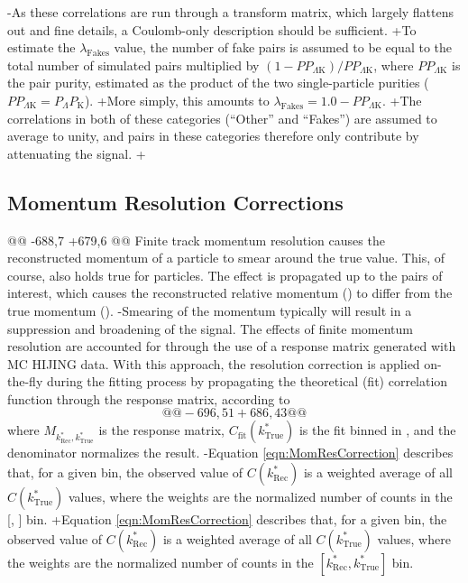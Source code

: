 \begin{table}[htbp]
\begin{table}[htbp]
-As these correlations are run through a transform matrix, which largely flattens out and fine details, a Coulomb-only description should be sufficient.   
+To estimate the $\lambda_{\mathrm{Fakes}}$ value, the number of fake pairs is assumed to be equal to the total number of simulated pairs multiplied by $(1-PP_{\Lambda\mathrm{K}})/PP_{\Lambda\mathrm{K}}$, where $PP_{\Lambda\mathrm{K}}$ is the \LamK pair purity, estimated as the product of the two single-particle purities ($PP_{\Lambda\mathrm{K}} = P_{\Lambda}P_{\mathrm{K}}$).
+More simply, this amounts to $\lambda_{\mathrm{Fakes}} = 1.0-PP_{\Lambda\mathrm{K}}$.
+The correlations in both of these categories (``Other'' and ``Fakes'') are assumed to average to unity, and pairs in these categories therefore only contribute by attenuating the signal. 
+
 
 
 \subsection{Momentum Resolution Corrections}
@@ -688,7 +679,6 @@
 Finite track momentum resolution causes the reconstructed momentum of a particle to smear around the true value.
 This, of course, also holds true for \Vz particles.
 The effect is propagated up to the pairs of interest, which causes the reconstructed relative momentum (\krec) to differ from the true momentum (\ktrue).
-Smearing of the momentum typically will result in a suppression and broadening of the signal.
 The effects of finite momentum resolution are accounted for through the use of a response matrix generated with MC HIJING data.
 With this approach, the resolution correction is applied on-the-fly during the fitting process by propagating the theoretical (fit) correlation function through the response matrix, according to
 \begin{equation}
@@ -696,51 +686,43 @@
 \label{eqn:MomResCorrection}
 \end{equation}
 where $M_{k^{*}_{\mathrm{Rec}},k^{*}_{\mathrm{True}}}$ is the response matrix, $C_{\mathrm{fit}}(k^{*}_{\mathrm{True}})$ is the fit binned in \ktrue, and the denominator normalizes the result.
-Equation \ref{eqn:MomResCorrection} describes that, for a given \krec bin, the observed value of $C(k^{*}_{\mathrm{Rec}})$ is a weighted average of all $C(k^{*}_{\mathrm{True}})$ values, where the weights are the normalized number of counts in the [\krec, \ktrue] bin.
+Equation \ref{eqn:MomResCorrection} describes that, for a given \krec bin, the observed value of $C(k^{*}_{\mathrm{Rec}})$ is a weighted average of all $C(k^{*}_{\mathrm{True}})$ values, where the weights are the normalized number of counts in the \mbox{$[k^{*}_{\mathrm{Rec}}, k^{*}_{\mathrm{True}}]$} bin.
 

\end{table}
\end{table}
